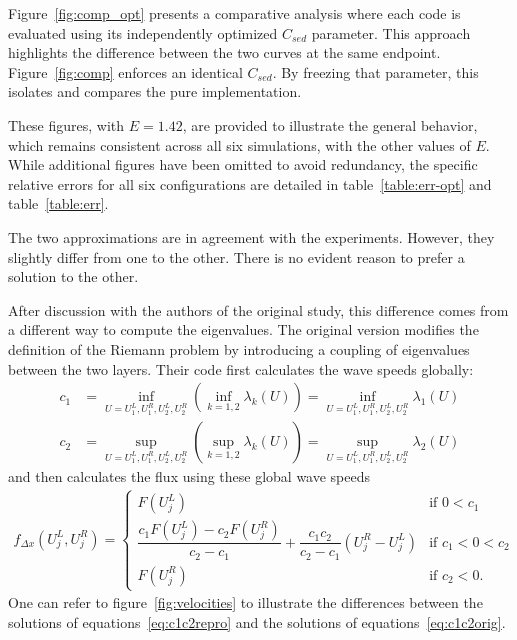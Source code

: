 Figure~\ref{fig:comp_opt} presents a comparative analysis where each code is evaluated using its independently optimized $C_{sed}$ parameter. This approach highlights the difference between the two curves at the same endpoint.
Figure~\ref{fig:comp} enforces an identical $C_{sed}$. By freezing that parameter, this isolates and compares the pure implementation.

These figures, with $E=1.42$, are provided to illustrate the general behavior, which remains consistent across all six simulations, with the other values of $E$. While additional figures have been omitted to avoid redundancy, the specific relative errors for all six configurations are detailed in table~\ref{table:err-opt} and table~\ref{table:err}.

The two approximations are in agreement with the experiments. However, they slightly differ from one to the other. There is no evident reason to prefer a solution to the other.

After discussion with the authors of the original study, this difference comes from a different way to compute the eigenvalues.
The original version modifies the definition of the Riemann problem by introducing a coupling of eigenvalues between the two layers. Their code first calculates the wave speeds globally:
\begin{subequations}
\label{eq:c1c2orig}
\begin{align}
    c_1 &= \inf_{U = U_1^L, U_1^R, U_2^L, U_2^R} \left( \inf_{k = {1,2}} \lambda_k(U)\right)  = \inf_{U = U_1^L, U_1^R, U_2^L, U_2^R} \lambda_1(U) \label{eq:c1orig} \\
    c_2 &= \sup_{U = U_1^L, U_1^R, U_2^L, U_2^R} \left( \sup_{k = {1,2}} \lambda_k(U)\right) = \sup_{U = U_1^L, U_1^R, U_2^L, U_2^R} \lambda_2(U) \label{eq:c2orig}
\end{align}
\end{subequations}
and then calculates the flux using these global wave speeds
\begin{align*}
    f_{\Delta x}(U_j^L,U_j^R) = \begin{cases}
        F(U_j^L) &\text{if $0 < c_1$}\\
        \dfrac{c_1 F(U_j^L) - c_2 F(U_j^R)}{c_2 - c_1}+ \dfrac{c_1 c_2}{c_2-c_1}(U_j^R-U_j^L) &\text{if $c_1 < 0 < c_2$}\\
        F(U_j^R) &\text{if $c_2 < 0$}.
    \end{cases}
\end{align*}
One can refer to figure~\ref{fig:velocities} to illustrate the differences between the solutions of equations~\eqref{eq:c1c2repro} and the solutions of equations~\eqref{eq:c1c2orig}.

